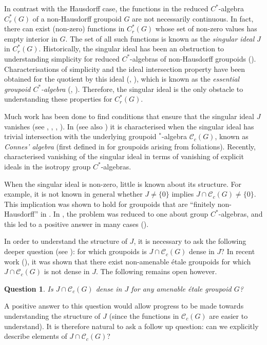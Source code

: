 \documentclass[11pt, oneside, reqno]{amsart}
\newcommand{\cg}{\mathscr{C}_c(G)}
\newtheorem{introquestion}{Question}
\theoremstyle{definition}
\theoremstyle{remark}
\numberwithin{equation}{section}
\begin{document}
In contrast with the Hausdorff case, the functions in the reduced $C^*$-algebra $C^*_r(G)$ of a non-Hausdorff groupoid $G$ are not necessarily continuous. In fact, there can exist (non-zero) functions in $C^*_r(G)$ whose set of non-zero values has empty interior in $G$. The set of all such functions is known as the \emph{singular ideal} $J$ in $C^*_r(G)$. Historically, the singular ideal has been an obstruction to understanding simplicity for reduced $C^*$-algebras of non-Hausdorff groupoids (\cite{CEPSS}). Characterisations of simplicity and the ideal intersection property have been obtained for the quotient by this ideal (\cite{CEPSS}, \cite{KKLRU}), which is known as the \emph{essential groupoid $C^*$-algebra} (\cite{KM21}, \cite{EP22}). Therefore, the singular ideal is the only obstacle to understanding these properties for $C^*_r(G)$.

Much work has been done to find conditions that ensure that the singular ideal $J$ vanishes (see \cite{CEPSS}, \cite{KM21}, \cite{NS23}, \cite{GNSV}). In \cite[Theorem~A]{BGHL} (see also \cite[Theorem~F]{Hume}) it is characterised when the singular ideal has trivial intersection with the underlying groupoid $^*$-algebra $\cg$, known as \emph{Connes' algebra} (first defined in \cite{Con82} for groupoids arising from foliations). Recently, \cite[Theorem~B]{Hume} characterised vanishing of the singular ideal in terms of vanishing of explicit ideals in the isotropy group $C^*$-algebras.

When the singular ideal is non-zero, little is known about its structure. For example, it is not known in general whether $J\neq \{0\}$ implies $J\cap\cg \neq \{0\}$. This implication was shown to hold for groupoids that are ``finitely non-Hausdorff'' in \cite[Theorem~C]{BGHL}. In \cite{Hume}, the problem was reduced to one about group $C^*$-algebras, and this led to a positive answer in many cases (\cite[Theorem~H]{Hume}).

In order to understand the structure of $J$, it is necessary to ask the following deeper question (see \cite[Question~4.11(III)]{BGHL}): for which groupoids is $J \cap \cg$ dense in $J$? In recent work (\cite{MS25}), it was shown that there exist non-amenable \'etale groupoids for which $J \cap \cg$ is not dense in $J$. The following remains open however.
\begin{introquestion}\label{question:dense?}
    Is $J \cap \cg$ dense in $J$ for any amenable \'etale groupoid $G$?
\end{introquestion}
A positive answer to this question would allow progress to be made towards understanding the structure of $J$ (since the functions in $\cg$ are easier to understand). It is therefore natural to ask a follow up question: can we explicitly describe elements of $J \cap \cg$? 
\end{document}
